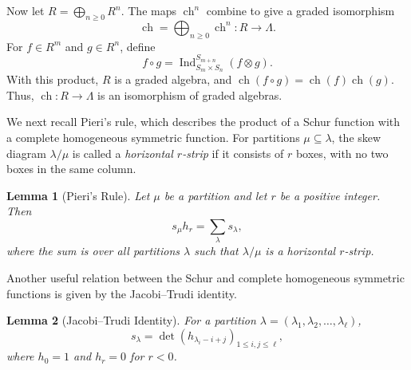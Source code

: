 \documentclass[12pt]{article}
\newtheorem{lemma}{Lemma}[section]
\theoremstyle{definition}
\newcommand{\1}{\mathbf 1}
\newcommand{\Ind}{\operatorname{Ind}}
\begin{document}
Now let $
R=\bigoplus_{n\geq 0}R^n.
$ The maps $\operatorname{ch}^n$ combine to give a graded isomorphism
$$
\operatorname{ch}
=
\bigoplus_{n\geq 0}\operatorname{ch}^n
:
R\longrightarrow\Lambda.
$$
For $f\in R^m$ and $g\in R^n$, define
$$
f\circ g
=
\Ind_{S_m\times S_n}^{S_{m+n}}
(f\otimes g).
$$
With this product, $R$ is a graded algebra, and $\operatorname{ch}(f\circ g)=\operatorname{ch}(f)\operatorname{ch}(g).$ Thus, $\operatorname{ch}:R\longrightarrow\Lambda$ is an isomorphism
of graded algebras.

















We next recall Pieri's rule, which describes the product of a Schur
function with a complete homogeneous symmetric function. For partitions
$\mu\subseteq\lambda$, the skew diagram $\lambda/\mu$ is called a
\emph{horizontal $r$-strip} if it consists of $r$ boxes, with no two
boxes in the same column.

\begin{lemma}[Pieri's Rule]
\label{lem:Pieri's_Formula}
Let $\mu$ be a partition and let $r$ be a positive integer. Then
$$
s_\mu h_r
=
\sum_{\lambda}s_\lambda,
$$
where the sum is over all partitions $\lambda$ such that
$\lambda/\mu$ is a horizontal $r$-strip.
\end{lemma}

Another useful relation between the Schur and complete homogeneous
symmetric functions is given by the Jacobi--Trudi identity.

\begin{lemma}[Jacobi--Trudi Identity]
\label{lem:Jacobi_Trudi}
For a partition $\lambda=(\lambda_1,\lambda_2,\ldots,\lambda_\ell)$,
$$
s_\lambda
=
\det\left(h_{\lambda_i-i+j}\right)_{1\leq i,j\leq\ell},
$$
where $h_0=1$ and $h_r=0$ for $r<0$.
\end{lemma}



\end{document}
